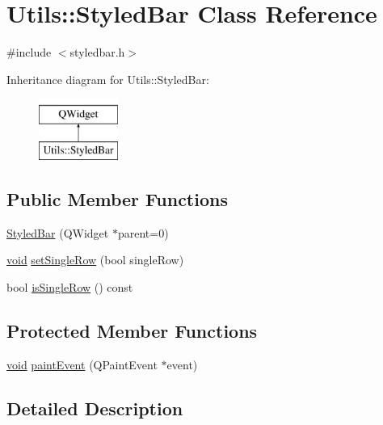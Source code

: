 \hypertarget{class_utils_1_1_styled_bar}{\section{Utils\-:\-:Styled\-Bar Class Reference}
\label{class_utils_1_1_styled_bar}
}


{\ttfamily \#include $<$styledbar.\-h$>$}

Inheritance diagram for Utils\-:\-:Styled\-Bar\-:\begin{figure}[H]
\begin{center}
\leavevmode
\includegraphics[height=2.000000cm]{class_utils_1_1_styled_bar}
\end{center}
\end{figure}
\subsection*{Public Member Functions}
\begin{DoxyCompactItemize}
\item 
\hyperlink{class_utils_1_1_styled_bar_a191ca303fdd1efdd8ca2e7d78e678bd8}{Styled\-Bar} (Q\-Widget $\ast$parent=0)
\item 
\hyperlink{group___u_a_v_objects_plugin_ga444cf2ff3f0ecbe028adce838d373f5c}{void} \hyperlink{class_utils_1_1_styled_bar_ae0468b2fdc01ce1025ef7ec9b1da109f}{set\-Single\-Row} (bool single\-Row)
\item 
bool \hyperlink{class_utils_1_1_styled_bar_aee19fe83b95c77581a06826031a6a897}{is\-Single\-Row} () const 
\end{DoxyCompactItemize}
\subsection*{Protected Member Functions}
\begin{DoxyCompactItemize}
\item 
\hyperlink{group___u_a_v_objects_plugin_ga444cf2ff3f0ecbe028adce838d373f5c}{void} \hyperlink{class_utils_1_1_styled_bar_acf3eab7743536d9fde75c2acb8fa8f9b}{paint\-Event} (Q\-Paint\-Event $\ast$event)
\end{DoxyCompactItemize}


\subsection{Detailed Description}


